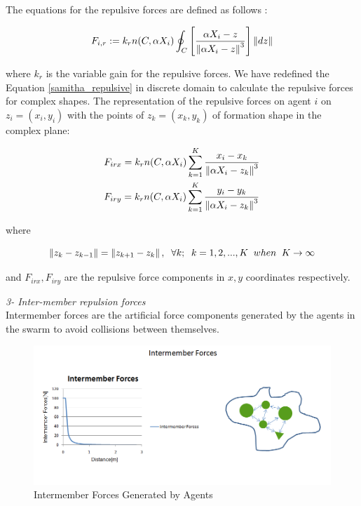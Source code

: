The equations for the repulsive forces are defined as follows \cite{17}:	

\begin{equation} \label{samitha_repulsive}
F_{i,r} := k_r  n(C,\alpha X_i) \oint_C \left[\frac{\alpha X_i - z}{\left\lVert\alpha X_i - z\right\rVert^3}\right] \left\lVert dz\right\rVert
\end{equation}

where $k_r$ is the variable gain for the repulsive forces. We have redefined the Equation \ref{samitha_repulsive} in discrete domain to calculate the repulsive forces for complex shapes. The representation of the repulsive forces on agent $i$ on $z_i = (x_i, y_i)$ with the points of  $z_k = (x_k,y_k)$ of formation shape in the complex plane:

\begin{align}
\begin{split}
& F_{irx} = k_r n(C,\alpha X_i)  \sum_{k=1}^{K} \frac{x_i - x_k}{\left\lVert\alpha X_i - z_k\right\rVert^3}\\
& F_{iry} = k_r n(C,\alpha X_i)  \sum_{k=1}^{K} \frac{y_i - y_k}{\left\lVert\alpha X_i - z_k\right\rVert^3}
\end{split}
\end{align}
				
where

\begin{equation}
\left\lVert z_k - z_{k-1}\right\rVert = \left\lVert z_{k+1} - z_k\right\rVert, \hspace{0.2cm}  \forall k ;  \hspace{0.2cm} k=1,2,...,K \hspace{0.2cm} when  \hspace{0.2cm} K \to\infty
\end{equation}
						
and $F_{irx} , F_{iry} $ are the repulsive force components in $x,y$ coordinates respectively. \newline
						
\textit{		3- Inter-member repulsion forces} \\ 
Intermember forces are the artificial force components generated by the agents in the swarm to avoid collisions between themselves. 
			
\begin{figure}[H]
\caption{Intermember Forces Generated by Agents}
\centering
\includegraphics[scale = 0.60]{intermember_forces}
\end{figure}
			
